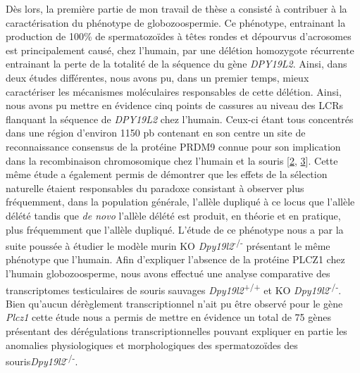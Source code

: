 \documentclass[12pt,twoside]{ugathesis}
\begin{document}
Dès lors, la première partie de mon travail de thèse a consisté à
contribuer à la caractérisation du phénotype de globozoospermie. Ce
phénotype, entrainant la production de 100\% de spermatozoïdes à têtes
rondes et dépourvus d'acrosomes est principalement causé, chez l'humain,
par une délétion homozygote récurrente entrainant la perte de la
totalité de la séquence du gène \emph{DPY19L2}. Ainsi, dans deux études
différentes, nous avons pu, dans un premier temps, mieux caractériser
les mécanismes moléculaires responsables de cette délétion. Ainsi, nous
avons pu mettre en évidence cinq points de cassures au niveau des LCRs
flanquant la séquence de \emph{DPY19L2} chez l'humain. Ceux-ci étant
tous concentrés dans une région d'environ 1150 pb contenant en son
centre un site de reconnaissance consensus de la protéine PRDM9 connue
pour son implication dans la recombinaison chromosomique chez l'humain
et la souris {[}\protect\hyperlink{ref-Parvanov2010}{2},
\protect\hyperlink{ref-Baudat2010}{3}{]}. Cette même étude a également
permis de démontrer que les effets de la sélection naturelle étaient
responsables du paradoxe consistant à observer plus fréquemment, dans la
population générale, l'allèle dupliqué à ce locus que l'allèle délété
tandis que \emph{de novo} l'allèle délété est produit, en théorie et en
pratique, plus fréquemment que l'allèle dupliqué. L'étude de ce
phénotype nous a par la suite poussée à étudier le modèle murin KO
\emph{Dpy19l2}\textsuperscript{-/-} présentant le même phénotype que
l'humain. Afin d'expliquer l'absence de la protéine PLCZ1 chez l'humain
globozoosperme, nous avons effectué une analyse comparative des
transcriptomes testiculaires de souris sauvages
\emph{Dpy19l2}\textsuperscript{+/+} et KO
\emph{Dpy19l2}\textsuperscript{-/-}. Bien qu'aucun dérèglement
transcriptionnel n'ait pu être observé pour le gène \emph{Plcz1} cette
étude nous a permis de mettre en évidence un total de 75 gènes
présentant des dérégulations transcriptionnelles pouvant expliquer en
partie les anomalies physiologiques et morphologiques des spermatozoïdes
des souris\emph{Dpy19l2}\textsuperscript{-/-}.
\end{document}
